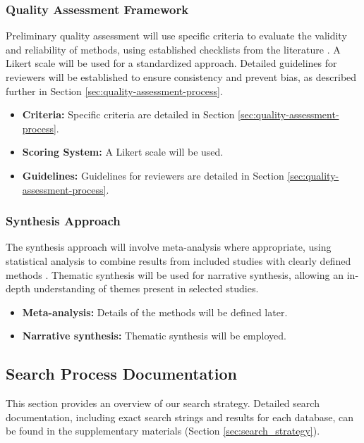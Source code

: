 \subsubsection{Quality Assessment Framework}
Preliminary quality assessment will use specific criteria to evaluate the validity and reliability of methods, using established checklists from the literature \cite{ben-nun_demystifying_2020}. A Likert scale will be used for a standardized approach. Detailed guidelines for reviewers will be established to ensure consistency and prevent bias, as described further in Section \ref{sec:quality-assessment-process}.
\begin{itemize}
    \item \textbf{Criteria:} Specific criteria are detailed in Section \ref{sec:quality-assessment-process}.
    \item \textbf{Scoring System:} A Likert scale will be used.
    \item \textbf{Guidelines:} Guidelines for reviewers are detailed in Section \ref{sec:quality-assessment-process}.
\end{itemize}

\subsubsection{Synthesis Approach}
The synthesis approach will involve meta-analysis where appropriate, using statistical analysis to combine results from included studies with clearly defined methods \cite{ben-nun_demystifying_2020}. Thematic synthesis will be used for narrative synthesis, allowing an in-depth understanding of themes present in selected studies.
\begin{itemize}
    \item \textbf{Meta-analysis:} Details of the methods will be defined later.
    \item \textbf{Narrative synthesis:} Thematic synthesis will be employed.
\end{itemize}

\subsection{Search Process Documentation}
\label{sec:search_process_documentation}
This section provides an overview of our search strategy. Detailed search documentation, including exact search strings and results for each database, can be found in the supplementary materials (Section \ref{sec:search_strategy}).

